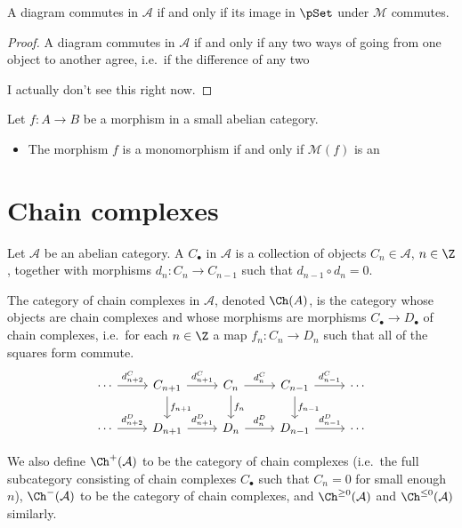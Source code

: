 \documentclass[main.tex]{subfiles}
\begin{document}
\begin{corollary}
  A diagram commutes in $\mathcal{A}$ if and only if its image in $\pSet$ under $\mathcal{M}$ commutes.
\end{corollary}
\begin{proof}
  A diagram commutes in $\mathcal{A}$ if and only if any two ways of going from one object to another agree, i.e.\ if the difference of any two

  I actually don't see this right now.
\end{proof}

\begin{lemma}
  \label{lemma:member_functor_preserves_mono_epi}
  Let $f\colon A \to B$ be a morphism in a small abelian category.
  \begin{itemize}
    \item The morphism $f$ is a monomorphism if and only if $\mathcal{M}(f)$ is an
  \end{itemize}
\end{lemma}

\section{Chain complexes}
\label{ssc:chain_complexes}

\begin{definition}
  \label{def:category_of_chain_complexes_abelian}
  Let $\mathcal{A}$ be an abelian category. A  $C_{\bullet}$ in $\mathcal{A}$ is a collection of objects $C_{n} \in \mathcal{A}$, $n \in \Z$, together with morphisms $d_{n}\colon C_{n} \to C_{n-1}$ such that $d_{n-1} \circ d_{n} = 0$.

  The category of chain complexes in $\mathcal{A}$, denoted $\Ch(A)$, is the category whose objects are chain complexes and whose morphisms are morphisms $C_{\bullet} \to D_{\bullet}$ of chain complexes, i.e.\ for each $n \in \Z$ a map $f_{n}\colon C_{n} \to D_{n}$ such that all of the squares form commute.
  \begin{equation*}
    \begin{tikzcd}
      \cdots
      \arrow[r, "d^{C}_{n+2}"]
      & C_{n+1}
      \arrow[r, "d^{C}_{n+1}"]
      \arrow[d, "f_{n+1}"]
      & C_{n}
      \arrow[r, "d^{C}_{n}"]
      \arrow[d, "f_{n}"]
      & C_{n-1}
      \arrow[r, "d^{C}_{n-1}"]
      \arrow[d, "f_{n-1}"]
      & \cdots
      \\
      \cdots
      \arrow[r, "d^{D}_{n+2}"]
      & D_{n+1}
      \arrow[r, "d^{D}_{n+1}"]
      & D_{n}
      \arrow[r, "d^{D}_{n}"]
      & D_{n-1}
      \arrow[r, "d^{D}_{n-1}"]
      & \cdots
    \end{tikzcd}
  \end{equation*}

  We also define $\Ch^{+}(\mathcal{A})$ to be the category of  chain complexes (i.e.\ the full subcategory consisting of chain complexes $C_{\bullet}$ such that $C_{n} = 0$ for small enough $n$), $\Ch^{-}(\mathcal{A})$ to be the category of  chain complexes, and $\Ch^{\geq 0}(\mathcal{A})$ and $\Ch^{\leq 0}(\mathcal{A})$ similarly.
\end{definition}
\end{document}
